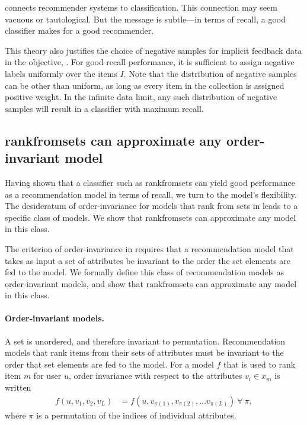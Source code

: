  connects recommender systems to classification. This connection may
seem vacuous or tautological. But the message is subtle---in terms of recall, a
good classifier makes for a good recommender.

This theory also justifies the choice of negative samples for implicit feedback
data in the objective, . For good recall performance, it is
sufficient to assign negative labels uniformly over the items $I$. Note that the
distribution of negative samples can be other than uniform, as long as every
item in the collection is assigned positive weight. In the infinite data limit,
any such distribution of negative samples will result in a classifier with
maximum recall.

\subsection{\acrshort{rankfromsets} can approximate any order-invariant model}

Having shown that a classifier such as \acrshort{rankfromsets} can yield good
performance as a recommendation model in terms of recall, we turn to the model's
flexibility. The desideratum of order-invariance for models that rank from sets
in  leads to a specific class of models. We show that
\acrshort{rankfromsets} can approximate any model in this class.

The criterion of order-invariance in  requires that a
recommendation model that takes as input a set of attributes be invariant to the
order the set elements are fed to the model. We formally define this class of
recommendation models as order-invariant models, and show that
\acrshort{rankfromsets} can approximate any model in this class.

\paragraph{Order-invariant models.} A set is unordered, and therefore invariant
to permutation. Recommendation models that rank items from their sets of
attributes must be invariant to the order that set elements are fed to the
model. For a model $f$ that is used to rank item $m$ for user $u$, order
invariance with respect to the attributes $v_i \in x_m$ is written
\begin{align}
  f(u, {v_1, v_2, v_L}) &= f(u, {v_{\pi(1)}, v_{\pi(2)}, \ldots
                                     v_{\pi(L)}})~\forall~\pi,
\label{eq:order-invariance}
\end{align}
where $\pi$ is a permutation of the indices of individual attributes.

